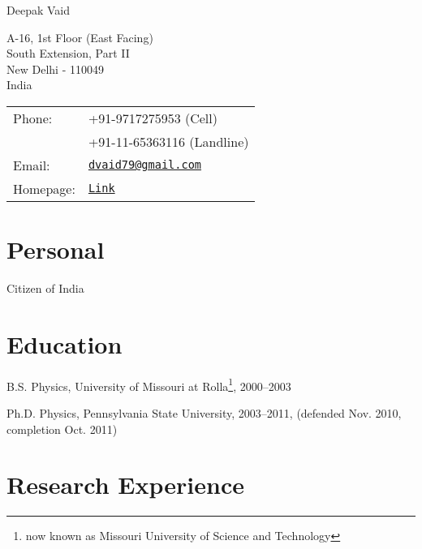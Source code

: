 \documentclass[letterpaper]{article}
\def\name{Deepak Vaid}
\renewenvironment{itemize}{
  \begin{list}{}{
    \setlength{\leftmargin}{1.5em}
  }
}{
  \end{list}
}
\begin{document}
{\huge \name}


\vspace{0.25in}

\begin{minipage}{0.45\linewidth}
  A-16, 1st Floor (East Facing) \\
  South Extension, Part II \\
  New Delhi - 110049 \\
  India
\end{minipage}
\begin{minipage}{0.45\linewidth}
  \begin{tabular}{ll}
    Phone: & +91-9717275953 (Cell) \\
     &  +91-11-65363116 (Landline)\\
    Email: & \href{mailto:dvaid79@gmail.com}{\tt dvaid79@gmail.com} \\
    Homepage: & \href{http://www.phys.psu.edu/people/display/index.html?person_id=1861}{\tt Link} \\
  \end{tabular}
\end{minipage}


\section*{Personal}

\begin{itemize}
\item Citizen of India
\end{itemize}


\section*{Education}

\begin{itemize}
  \item B.S. Physics, University of Missouri at Rolla\footnote{now known as Missouri University of Science and Technology }, 2000--2003
  \item Ph.D. Physics, Pennsylvania State University, 2003--2011, (defended Nov. 2010, completion Oct. 2011)
\end{itemize}


\section*{Research Experience}
\end{document}
